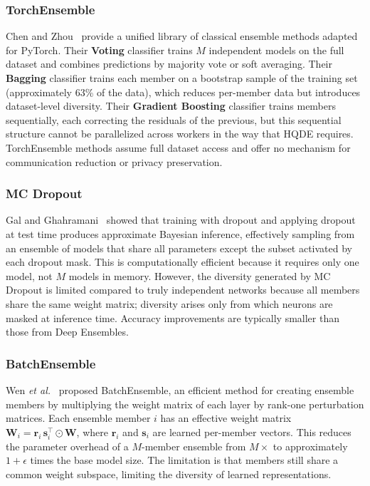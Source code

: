 \documentclass[journal,twoside]{IEEEtran}
\newcommand{\hqde}{\mbox{HQDE}\xspace}
\newcommand{\etal}{\textit{et al.}\xspace}
\begin{document}
\subsubsection{TorchEnsemble}

Chen and Zhou~\cite{zhou2022torchensemble} provide a unified library of
classical ensemble methods adapted for PyTorch. Their \textbf{Voting}
classifier trains $M$ independent models on the full dataset and
combines predictions by majority vote or soft averaging. Their
\textbf{Bagging} classifier trains each member on a bootstrap sample
of the training set (approximately 63\% of the data), which reduces
per-member data but introduces dataset-level diversity. Their
\textbf{Gradient Boosting} classifier trains members sequentially, each
correcting the residuals of the previous, but this sequential structure
cannot be parallelized across workers in the way that \hqde{} requires.
TorchEnsemble methods assume full dataset access and offer no mechanism
for communication reduction or privacy preservation.

\subsubsection{MC Dropout}

Gal and Ghahramani~\cite{gal2016dropout} showed that training with
dropout and applying dropout at test time produces approximate Bayesian
inference, effectively sampling from an ensemble of models that share
all parameters except the subset activated by each dropout mask. This
is computationally efficient because it requires only one model, not
$M$ models in memory. However, the diversity generated by MC Dropout
is limited compared to truly independent networks because all members
share the same weight matrix; diversity arises only from which neurons
are masked at inference time. Accuracy improvements are typically
smaller than those from Deep Ensembles.

\subsubsection{BatchEnsemble}

Wen \etal~\cite{wen2020batchensemble} proposed BatchEnsemble, an
efficient method for creating ensemble members by multiplying the weight
matrix of each layer by rank-one perturbation matrices. Each ensemble
member $i$ has an effective weight matrix $\mathbf{W}_i =
\mathbf{r}_i\,\mathbf{s}_i^{\top} \odot \mathbf{W}$, where
$\mathbf{r}_i$ and $\mathbf{s}_i$ are learned per-member vectors.
This reduces the parameter overhead of a $M$-member ensemble from
$M\times$ to approximately $1+\epsilon$ times the base model size.
The limitation is that members still share a common weight subspace,
limiting the diversity of learned representations.
\end{document}
